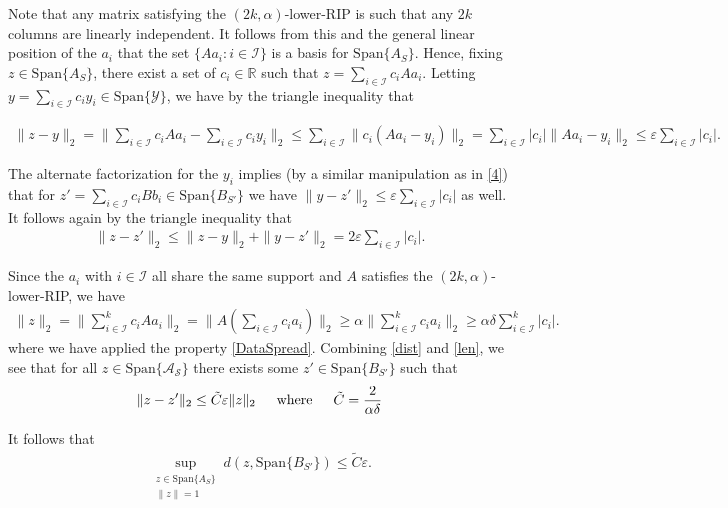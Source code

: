 \documentclass[journal,onecolumn]{IEEEtran}
\begin{document}
Note that any matrix satisfying the $(2k,\alpha)$-lower-RIP is such that any $2k$ columns are linearly independent. It follows from this and the general linear position of the $a_i$ that the set $\{Aa_i: i \in \mathcal{I}\}$ is a basis for $\text{Span}\{A_S\}$. Hence, fixing $z \in \text{Span}\{A_S\}$, there exist a set of $c_i \in \mathbb{R}$ such that $z = \sum_{i \in \mathcal{I}} c_iAa_i$. Letting $y = \sum_{i \in \mathcal{I}} c_iy_i  \in \text{Span}\{\mathcal{Y}\}$, we have by the triangle inequality that

\begin{align}\label{4}
\|z - y\|_2 = \| \sum_{i \in \mathcal{I}} c_i A a_i -  \sum_{i \in \mathcal{I}} c_i y_i \|_2 \leq \sum_{i \in \mathcal{I}} \| c_i (Aa_i - y_i) \|_2 = \sum_{i \in \mathcal{I}} |c_i| \| Aa_i - y_i \|_2 \leq \varepsilon \sum_{i \in \mathcal{I}} |c_i|.
\end{align}

The alternate factorization for the $y_i$ implies (by a similar manipulation as in \eqref{4}) that for $z' = \sum_{i \in \mathcal{I}} c_i Bb_i \in \text{Span}\{B_{S'}\}$ we have $\|y - z'\|_2 \leq \varepsilon \sum_{i \in \mathcal{I}} |c_i|$ as well. It follows again by the triangle inequality that
\begin{align}\label{dist}
\|z - z'\|_2 \leq \|z - y\|_2 + \|y - z'\|_2 = 2 \varepsilon \sum_{i \in \mathcal{I}} |c_i|.
\end{align}

Since the $a_i$ with $i \in \mathcal{I}$ all share the same support and $A$ satisfies the $(2k,\alpha)$-lower-RIP, we have 
\begin{align}\label{len}
\|z\|_2 = \|\sum_{i \in \mathcal{I}}^k c_i A a_i\|_2 
= \|A (\sum_{i \in \mathcal{I}} c_i a_i) \|_2 
\geq \alpha \|\sum_{i \in \mathcal{I}}^k c_i a_i\|_2 
\geq \alpha\delta \sum_{i \in \mathcal{I}}^k |c_i|.
\end{align}
%
where we have applied the property \eqref{DataSpread}. Combining \eqref{dist} and \eqref{len}, we see that for all $z \in \text{Span}\{\mathcal{A_S}\}$ there exists some $z' \in \text{Span}\{B_{S'}\}$ such that
\begin{align}
\|z - z'\|_2 \leq \tilde C\varepsilon \|z\|_2 \indent \text{where} \indent \tilde C = \frac{ 2 }{ \alpha \delta }
\end{align}

It follows that
\begin{align}\label{ABSubspaceDistance}
\sup_{ \substack{ z \in \text{Span}\{A_{S}\} \\ \|z\| = 1} } d(z, \text{Span}\{B_{S'}\}) \leq \tilde C\varepsilon.
\end{align}
\end{document}
